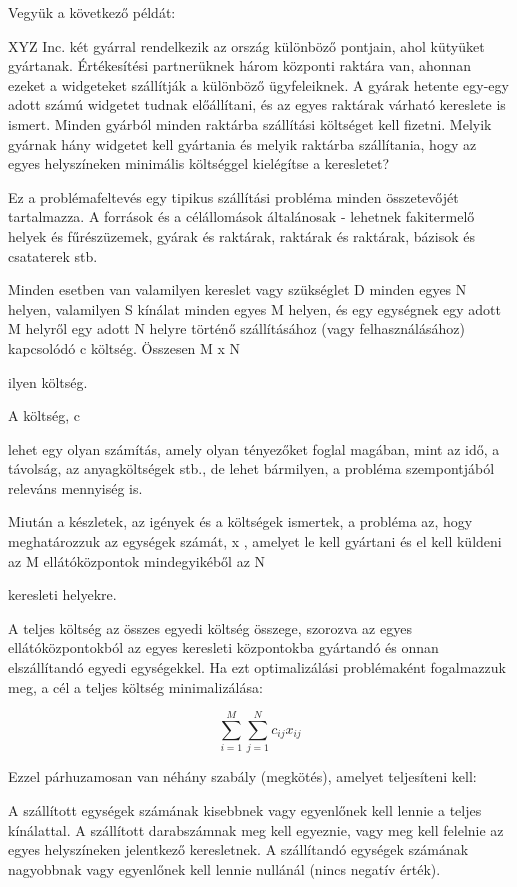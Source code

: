 	Vegyük a következő példát:
	
	XYZ Inc. két gyárral rendelkezik az ország különböző pontjain, ahol kütyüket gyártanak. Értékesítési partnerüknek három központi raktára van, ahonnan ezeket a widgeteket szállítják a különböző ügyfeleiknek. A gyárak hetente egy-egy adott számú widgetet tudnak előállítani, és az egyes raktárak várható kereslete is ismert. Minden gyárból minden raktárba szállítási költséget kell fizetni. Melyik gyárnak hány widgetet kell gyártania és melyik raktárba szállítania, hogy az egyes helyszíneken minimális költséggel kielégítse a keresletet?
	
	Ez a problémafeltevés egy tipikus szállítási probléma minden összetevőjét tartalmazza. A források és a célállomások általánosak - lehetnek fakitermelő helyek és fűrészüzemek, gyárak és raktárak, raktárak és raktárak, bázisok és csataterek stb.
	
	Minden esetben van valamilyen kereslet vagy szükséglet D
	minden egyes N helyen, valamilyen S kínálat minden egyes M helyen, és egy egységnek egy adott M helyről egy adott N helyre történő szállításához (vagy felhasználásához) kapcsolódó c költség. Összesen M x N
	
	ilyen költség.
	
	A költség, c
	
	lehet egy olyan számítás, amely olyan tényezőket foglal magában, mint az idő, a távolság, az anyagköltségek stb., de lehet bármilyen, a probléma szempontjából releváns mennyiség is.
	
	Miután a készletek, az igények és a költségek ismertek, a probléma az, hogy meghatározzuk az egységek számát, x
	, amelyet le kell gyártani és el kell küldeni az M ellátóközpontok mindegyikéből az N
	
	keresleti helyekre.
	
	A teljes költség az összes egyedi költség összege, szorozva az egyes ellátóközpontokból az egyes keresleti központokba gyártandó és onnan elszállítandó egyedi egységekkel. Ha ezt optimalizálási problémaként fogalmazzuk meg, a cél a teljes költség minimalizálása:
	
	$$\sum_{i=1}^M \sum_{j=1}^N c_{ij}x_{ij}$$

Ezzel párhuzamosan van néhány szabály (megkötés), amelyet teljesíteni kell:

A szállított egységek számának kisebbnek vagy egyenlőnek kell lennie a teljes kínálattal.
A szállított darabszámnak meg kell egyeznie, vagy meg kell felelnie az egyes helyszíneken jelentkező keresletnek.
A szállítandó egységek számának nagyobbnak vagy egyenlőnek kell lennie nullánál (nincs negatív érték).

